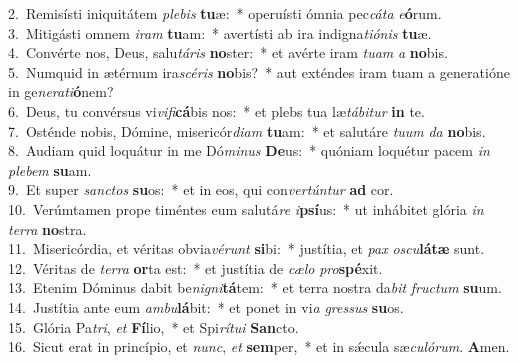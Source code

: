 {2.~}Remisísti iniquitátem \textit{ple}\textit{bis} \textbf{tu}æ:~* operuísti ómnia pec\textit{cá}\textit{ta} \textit{e}\textbf{ó}rum.\\
{3.~}Mitigásti omnem \textit{i}\textit{ram} \textbf{tu}am:~* avertísti ab ira indigna\textit{ti}\textit{ó}\textit{nis} \textbf{tu}æ.\\
{4.~}Convérte nos, Deus, salu\textit{tá}\textit{ris} \textbf{no}ster:~* et avérte iram \textit{tu}\textit{am} \textit{a} \textbf{no}bis.\\
{5.~}Numquid in ætérnum ira\textit{scé}\textit{ris} \textbf{no}bis?~* aut exténdes iram tuam a generatióne in ge\textit{ne}\textit{ra}\textit{ti}\textbf{ó}nem?\\
{6.~}Deus, tu convérsus vi\textit{vi}\textit{fi}\textbf{cá}bis nos:~* et plebs tua læ\textit{tá}\textit{bi}\textit{tur} \textbf{in} te.\\
{7.~}Osténde nobis, Dómine, misericór\textit{di}\textit{am} \textbf{tu}am:~* et salutáre \textit{tu}\textit{um} \textit{da} \textbf{no}bis.\\
{8.~}Audiam quid loquátur in me Dó\textit{mi}\textit{nus} \textbf{De}us:~* quóniam loquétur pacem \textit{in} \textit{ple}\textit{bem} \textbf{su}am.\\
{9.~}Et super \textit{san}\textit{ctos} \textbf{su}os:~* et in eos, qui con\textit{ver}\textit{tún}\textit{tur} \textbf{ad} cor.\\
{10.~}Verúmtamen prope timéntes eum salutá\textit{re} \textit{i}\textbf{psí}us:~* ut inhábitet glória \textit{in} \textit{ter}\textit{ra} \textbf{no}stra.\\
{11.~}Misericórdia, et véritas obvia\textit{vé}\textit{runt} \textbf{si}bi:~* justítia, et \textit{pax} \textit{o}\textit{scu}\textbf{lá}\textbf{tæ} sunt.\\
{12.~}Véritas de \textit{ter}\textit{ra} \textbf{or}ta est:~* et justítia de \textit{cæ}\textit{lo} \textit{pro}\textbf{spé}xit.\\
{13.~}Etenim Dóminus dabit be\textit{ni}\textit{gni}\textbf{tá}tem:~* et terra nostra da\textit{bit} \textit{fru}\textit{ctum} \textbf{su}um.\\
{14.~}Justítia ante eum \textit{am}\textit{bu}\textbf{lá}bit:~* et ponet in vi\textit{a} \textit{gres}\textit{sus} \textbf{su}os.\\
{15.~}Glória Pa\textit{tri}, \textit{et} \textbf{Fí}lio,~* et Spi\textit{rí}\textit{tu}\textit{i} \textbf{San}cto.\\
{16.~}Sicut erat in princípio, et \textit{nunc}, \textit{et} \textbf{sem}per,~* et in sǽcula sæ\textit{cu}\textit{ló}\textit{rum}. \textbf{A}men.\\
